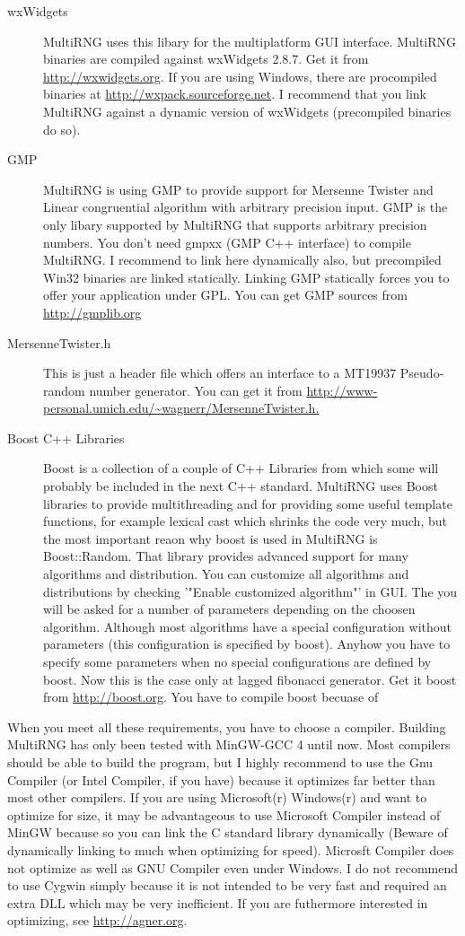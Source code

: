 \documentclass{scrartcl}
\begin{document}
\begin{description}
\item[wxWidgets]MultiRNG uses this libary for the multiplatform GUI interface. MultiRNG binaries are compiled against wxWidgets 2.8.7. Get it from \url{http://wxwidgets.org}. If you are using Windows, there are procompiled binaries at \url{http://wxpack.sourceforge.net}. I recommend that you link MultiRNG against a dynamic version of wxWidgets (precompiled binaries do so).
\item[GMP]MultiRNG is using GMP to provide support for Mersenne Twister and Linear congruential algorithm with arbitrary precision input. GMP is the only libary supported by MultiRNG that supports arbitrary precision numbers. You don't need gmpxx (GMP C++ interface) to compile MultiRNG. I recommend to link here dynamically also, but precompiled Win32 binaries are linked statically. Linking GMP statically forces you to offer your application under GPL. You can get GMP sources from \url{http://gmplib.org}
\item[MersenneTwister.h]This is just a header file which offers an interface to a MT19937 Pseudo-random number generator. You can get it from\newline
\url{http://www-personal.umich.edu/~wagnerr/MersenneTwister.h.}
\item[Boost C++ Libraries]Boost is a collection of a couple of C++ Libraries from which some will probably be included in the next C++ standard. MultiRNG uses Boost libraries to provide multithreading and for providing some useful template functions, for example lexical cast which shrinks the code very much, but the most important reaon why boost is used in MultiRNG is Boost::Random. That library provides advanced support for many algorithms and distribution. You can customize all algorithms and distributions by checking '"Enable customized algorithm"' in GUI. The you will be asked for a number of parameters depending on the choosen algorithm. Although most algorithms have a special configuration without parameters (this configuration is specified by boost). Anyhow you have to specify some parameters when no special configurations are defined by boost. Now this is the case only at lagged fibonacci generator. Get it boost from \url{http://boost.org}. You have to compile boost becuase of 
\end{description}
When you meet all these requirements, you have to choose a compiler. Building MultiRNG has only been tested with MinGW-GCC 4 until now. Most compilers should be able to build the program, but I highly recommend to use the Gnu Compiler (or Intel Compiler, if you have) because it optimizes far better than most other compilers. If you are using Microsoft(r) Windows(r) and want to optimize for size, it may be advantageous to use Microsoft Compiler instead of MinGW because so you can link the C standard library dynamically (Beware of dynamically linking to much when optimizing for speed). Microsft Compiler does not optimize as well as GNU Compiler even under Windows. I do not recommend to use Cygwin simply because it is not intended to be very fast and required an extra DLL which may be very inefficient. If you are futhermore interested in optimizing, see \url{http://agner.org}.\newline
\end{document}
